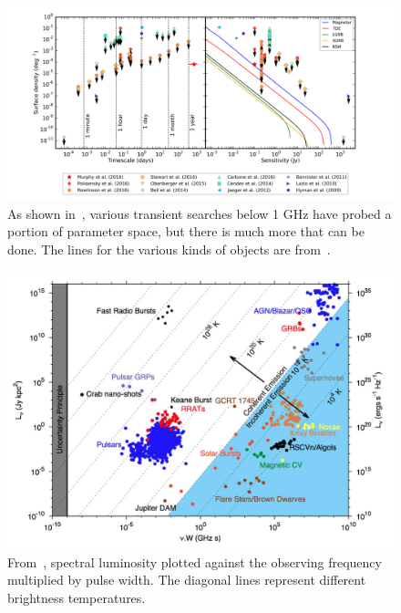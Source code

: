 \documentclass[12pt]{article}
\begin{document}
	\begin{figure}
		\includegraphics[width=\textwidth]{rates.png}
		\caption{As shown in~\citep{2017MNRAS.466.1944M}, various transient searches below 1 GHz have probed a portion of parameter space, but there is much more that can be done. The lines for the various kinds of objects are from~\citep{2015ApJ...806..224M}.}
		\label{murphy2017}
	\end{figure}


	\begin{figure}
		\begin{center}
			\includegraphics[width=\textwidth]{dario_var_lum.png}
			\caption{From~\citep{2015MNRAS.446.3687P}, spectral luminosity plotted against the observing frequency multiplied by pulse width. The diagonal lines represent different brightness temperatures.}
			\label{dario_var_lum}	
		\end{center}
	\end{figure}
\end{document}

